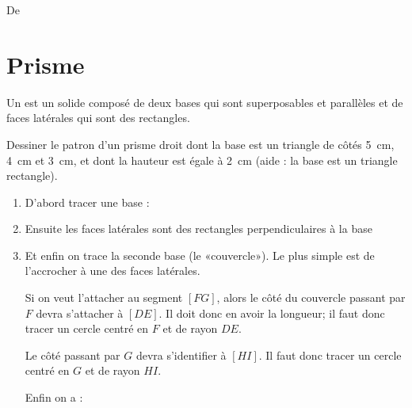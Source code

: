 

De \cite{NRHooXFvgpp5}

\section{Prisme}

\begin{definition}
    Un  est un solide composé de deux bases qui sont superposables et parallèles et de faces latérales qui sont des rectangles.
\end{definition}


\begin{example}
    Dessiner le patron d'un prisme droit dont la base est un triangle de côtés \SI{5}{\centi\meter}, \SI{4}{\centi\meter} et \SI{3}{\centi\meter}, et dont la hauteur est égale à \SI{2}{\centi\meter} (aide : la base est un triangle rectangle).

    \begin{enumerate}
        \item
            D'abord tracer une base :


\begin{center}
   
\end{center}
\item
    Ensuite les faces latérales sont des rectangles perpendiculaires à la base
\begin{center}
   
\end{center}
\item
    Et enfin on trace la seconde base (le «couvercle»). Le plus simple est de l'accrocher à une des faces latérales.

    Si on veut l'attacher au segment \( [FG]\), alors le côté du couvercle passant par \( F\) devra s'attacher à \( [DE]\). Il doit donc en avoir la longueur; il faut donc tracer un cercle centré en \( F\) et de rayon \( DE\).

    Le côté passant par \( G\) devra s'identifier à \( [HI]\). Il faut donc tracer un cercle centré en \( G\) et de rayon \( HI\).

\begin{center}
   
\end{center}

Enfin on a :

\begin{center}

\end{center}

    \end{enumerate}

\end{example}
